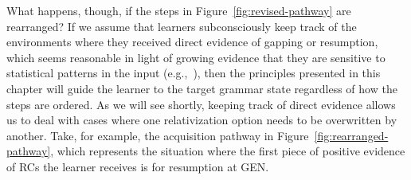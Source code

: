 What happens, though, if the steps in Figure~\ref{fig:revised-pathway} are rearranged? If we assume that learners subconsciously keep track of the environments where they received direct evidence of gapping or resumption, which seems reasonable in light of growing evidence that they are sensitive to statistical patterns in the input (e.g.,~\cite{romberg.saffran2010}), then the principles presented in this chapter will guide the learner to the target grammar state regardless of how the steps are ordered. As we will see shortly, keeping track of direct evidence allows us to deal with cases where one relativization option needs to be overwritten by another. Take, for example, the acquisition pathway in Figure~\ref{fig:rearranged-pathway}, which represents the situation where the first piece of positive evidence of RCs the learner receives is for resumption at GEN.

